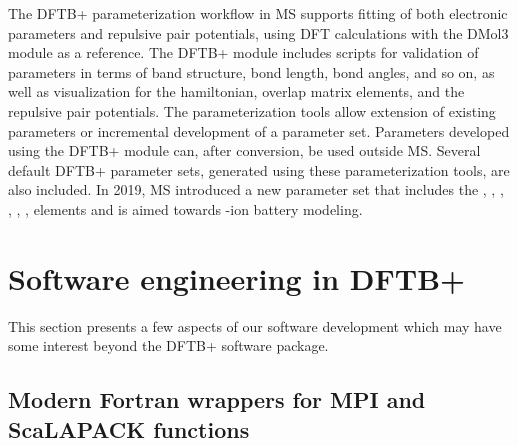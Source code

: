 \documentclass[reprint,onecolumn,superscriptaddress]{revtex4-1}
\newcommand{\dftbp}{DFTB+}
\begin{document}
The \dftbp{} parameterization workflow in MS supports fitting of both electronic
parameters and repulsive pair potentials, using DFT calculations with the DMol3
module \cite{Delley1,Delley2} as a reference. The \dftbp{} module includes
scripts for validation of parameters in terms of band structure, bond length,
bond angles, and so on, as well as visualization for the hamiltonian, overlap
matrix elements, and the repulsive pair potentials. The parameterization tools
allow extension of existing parameters or incremental development of a parameter
set. Parameters developed using the \dftbp{} module can, after conversion, be
used outside MS. Several default \dftbp{} parameter sets, generated using these
parameterization tools, are also included. In 2019, MS introduced a new
parameter set that includes the , , , , , ,
 elements and is aimed towards -ion battery modeling.


\section{Software engineering in \dftbp{}}

This section presents a few aspects of our software development which may have
some interest beyond the \dftbp{} software package.


\subsection{Modern Fortran wrappers for MPI and ScaLAPACK functions}
\end{document}
